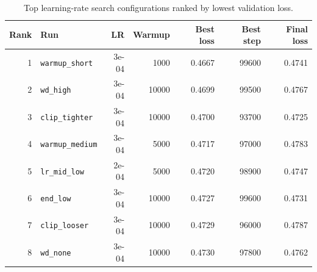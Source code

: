 \begin{table}[H]
\centering
\caption{Top learning-rate search configurations ranked by lowest validation loss.}
\label{tab:lr-search-ranking}
\begin{tabular}{@{}r l r r r r r@{}}
\toprule
\textbf{Rank} & \textbf{Run} & \textbf{LR} & \textbf{Warmup} & \textbf{Best loss} & \textbf{Best step} & \textbf{Final loss} \\
\midrule
1 & \texttt{warmup\_short} & 3e-04 & 1000 & 0.4667 & 99600 & 0.4741 \\
2 & \texttt{wd\_high} & 3e-04 & 10000 & 0.4699 & 99500 & 0.4767 \\
3 & \texttt{clip\_tighter} & 3e-04 & 10000 & 0.4700 & 93700 & 0.4725 \\
4 & \texttt{warmup\_medium} & 3e-04 & 5000 & 0.4717 & 97000 & 0.4783 \\
5 & \texttt{lr\_mid\_low} & 2e-04 & 5000 & 0.4720 & 98900 & 0.4747 \\
6 & \texttt{end\_low} & 3e-04 & 10000 & 0.4727 & 99600 & 0.4731 \\
7 & \texttt{clip\_looser} & 3e-04 & 10000 & 0.4729 & 96000 & 0.4787 \\
8 & \texttt{wd\_none} & 3e-04 & 10000 & 0.4730 & 97800 & 0.4762 \\
\bottomrule
\end{tabular}
\end{table}
